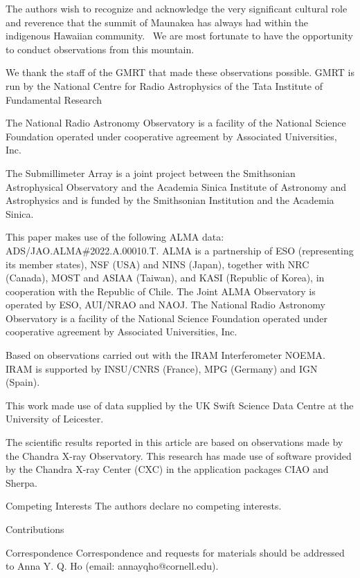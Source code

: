 \documentclass{nature_plusfigure}
\begin{document}
\begin{addendum}
The authors wish to recognize and acknowledge the very significant cultural role and reverence that the summit of Maunakea has always had within the indigenous Hawaiian community.  We are most fortunate to have the opportunity to conduct observations from this mountain.

We thank the staff of the GMRT that made these observations possible. GMRT is run by the National Centre for Radio Astrophysics of the Tata Institute of Fundamental Research

The National Radio Astronomy Observatory is a facility of the National Science Foundation operated under cooperative agreement by Associated Universities, Inc.

The Submillimeter Array is a joint project between the Smithsonian Astrophysical Observatory and the Academia Sinica Institute of Astronomy and Astrophysics and is funded by the Smithsonian Institution and the Academia Sinica.

This paper makes use of the following ALMA data: ADS/JAO.ALMA\#2022.A.00010.T. ALMA is a partnership of ESO (representing its member states), NSF (USA) and NINS (Japan), together with NRC (Canada), MOST and ASIAA (Taiwan), and KASI (Republic of Korea), in cooperation with the Republic of Chile. The Joint ALMA Observatory is operated by ESO, AUI/NRAO and NAOJ. The National Radio Astronomy Observatory is a facility of the National Science Foundation operated under cooperative agreement by Associated Universities, Inc.

Based on observations carried out with the IRAM Interferometer NOEMA. IRAM is supported by INSU/CNRS (France), MPG (Germany) and IGN (Spain).

This work made use of data supplied by the UK Swift Science Data Centre at the University of Leicester.

The scientific results reported in this article are based on observations made by the Chandra X-ray Observatory. This research has made use of software provided by the Chandra X-ray Center (CXC) in the application packages CIAO and Sherpa.


 \item[Competing Interests] The authors declare no competing interests.

\item[Contributions] 

 \item[Correspondence] Correspondence and requests for materials
should be addressed to Anna Y. Q. Ho (email: annayqho@cornell.edu).


\end{addendum}
\end{document}
